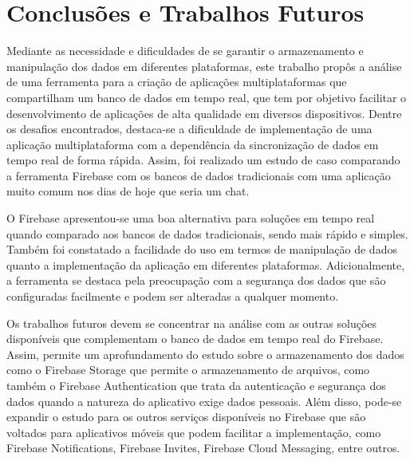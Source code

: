 \documentclass[12pt]{article}
\begin{document}
\section{Conclusões e Trabalhos Futuros}
Mediante as necessidade e dificuldades de se garantir o armazenamento e manipulação dos dados em diferentes plataformas, este trabalho propôs a análise de uma ferramenta para a criação de aplicações multiplataformas que compartilham um banco de dados em tempo real, que tem por objetivo facilitar o desenvolvimento de aplicações de alta qualidade em diversos dispositivos. Dentre os desafios encontrados, destaca-se a dificuldade de implementação de uma aplicação multiplataforma com a dependência da sincronização de dados em tempo real de forma rápida. Assim, foi realizado um estudo de caso comparando a ferramenta Firebase com os bancos de dados tradicionais com uma aplicação muito comum nos dias de hoje que seria um chat. 

O Firebase apresentou-se uma boa alternativa para soluções em tempo real quando comparado aos bancos de dados tradicionais, sendo mais rápido e simples. Também foi constatado a facilidade do uso em termos de manipulação de dados quanto a implementação da aplicação em diferentes plataformas. Adicionalmente, a ferramenta se destaca pela preocupação com a segurança dos dados que são configuradas facilmente e podem ser alteradas a qualquer momento.

Os trabalhos futuros devem se concentrar na análise com as outras soluções disponíveis que complementam o banco de dados em tempo real do Firebase. Assim, permite um aprofundamento do estudo sobre o armazenamento dos dados como o Firebase Storage que permite o armazenamento de arquivos, como também o Firebase Authentication que trata da autenticação e segurança dos dados quando a natureza do aplicativo exige dados pessoais. Além disso, pode-se expandir o estudo para os outros serviços disponíveis no Firebase que são voltados para aplicativos móveis que podem facilitar a implementação, como Firebase Notifications, Firebase Invites, Firebase Cloud Messaging, entre outros.




\end{document}
